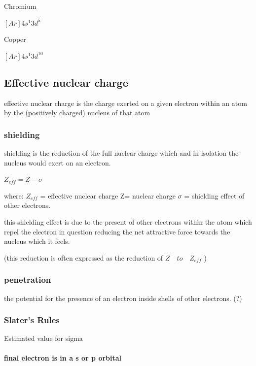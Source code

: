 \documentclass[]{article}
\let\oldparagraph\paragraph
\renewcommand{\paragraph}[1]{\oldparagraph{#1}\mbox{}}
\begin{document}
Chromium

\([Ar]4s^{1}3d^{5}\)

Copper

\([Ar]4s^{1}3d^{10}\)

\hypertarget{effective-nuclear-charge}{%
\subsection{Effective nuclear charge}\label{effective-nuclear-charge}}

effective nuclear charge is the charge exerted on a given electron
within an atom by the (positively charged) nucleus of that atom

\hypertarget{shielding}{%
\subsubsection{shielding}\label{shielding}}

shielding is the reduction of the full nuclear charge which and in
isolation the nucleus would exert on an electron.

\(Z_{eff} = Z - \sigma\quad\)

where: \(Z_{eff}\) = effective nuclear charge Z= nuclear charge
\(\sigma\) = shielding effect of other electrons.

this shielding effect is due to the present of other electrons within
the atom which repel the electron in question reducing the net
attractive force towards the nucleus which it feels.

(this reduction is often expressed as the reduction of
\(Z \quad to \quad Z_{eff}\) )

\hypertarget{penetration}{%
\subsubsection{penetration}\label{penetration}}

the potential for the presence of an electron inside shells of other
electrons. (?)

\hypertarget{slaters-rules}{%
\subsubsection{Slater's Rules}\label{slaters-rules}}

Estimated value for sigma

\hypertarget{final-electron-is-in-a-s-or-p-orbital}{%
\paragraph{final electron is in a s or p
orbital}\label{final-electron-is-in-a-s-or-p-orbital}}
\end{document}
